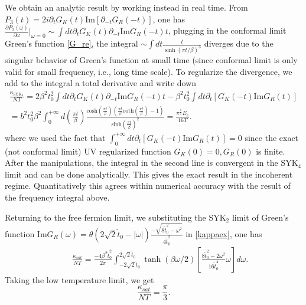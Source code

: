 \documentclass[twocolumn,floatfix,superscriptaddress]{revtex4-1}
\begin{document}
\begin{widetext}
We obtain an analytic result by working instead in real time. From $P_3(t)=2i\partial_tG_K(t)\text{Im}[\partial_{-t}G_R(-t)]$, one has $\frac{\partial P_3(\omega)}{\partial \omega}|_{\omega=0}\sim \int dt \partial_t G_K(t)\partial _{-t} \text{Im}G_R(-t) t$, plugging in the conformal limit Green's function \eqref{G_re}, the integral $\sim \int dt \frac{t}{\sinh(\pi t/\beta)^3}$ diverges due to the singular behavior of Green's function at small time (since conformal limit is only valid for small frequency, i.e., long time scale). To regularize the divergence, we add to the integral a total derivative and write down
\begin{eqnarray}
\frac{\kappa_{\text{SYK}_4}}{NT}=2\beta^2t_0^2\int dt  \partial_t G_K(t)\partial _{-t} \text{Im}G_R(-t) t-\beta^2 t_0^2 \int dt \partial_t[G_K(-t)\text{Im}G_R(t)]\nonumber\\
=b^2t_0^2\beta^2\int_0^{+\infty} d(\frac{\pi t}{\beta}) \frac{\text{cosh}(\frac{\pi t}{\beta})(\frac{\pi t}{\beta}\text{coth} (\frac{\pi t}{\beta})-1)}{\text{sinh}(\frac{\pi t}{\beta})^2}=\frac{\pi^{\frac{5}{2}}E_c}{16 T}.
\end{eqnarray}
where we used the fact that $\int_0^{+\infty}
dt \partial_t[G_K(-t)\text{Im}G_R(t)]=0$ since the exact (not
conformal limit) UV regularized function $G_K(0)=0, G_R(0)$ is
finite.  After the manipulations, the integral in the second line is
convergent in the SYK$_4$ limit and can be done analytically.  This
gives the exact result in the incoherent regime.  Quantitatively this
agrees within numerical accuracy with the result of the frequency
integral above.

Returning to the free fermion limit, we substituting the SYK$_2$ limit of Green's function $\text{Im}G_R(\omega)=\theta(2\sqrt 2 \tilde t_0-|\omega|)\frac{-\sqrt{8\tilde t_0^2-\omega^2}}{4\tilde t_0^2}$ in \eqref{kappaex}, one has
 \begin{eqnarray}
 &&\frac{\kappa_{sat}}{NT}=\frac{-4\beta^2\tilde
    t_0^2}{2\pi}\int_{-2\sqrt 2 \tilde t_0}^{2\sqrt 2 \tilde t_0}
    \tanh(\beta\omega/2)[\frac{8\tilde t_0^2-2\omega^2}{16\tilde
    t_0^4}\omega] d\omega. 
\end{eqnarray}
Taking the low temperature limit, we get
\begin{equation}
  \label{eq:2}
  \frac{\kappa_{sat}}{NT}=\frac{\pi}{3}.
\end{equation}



\end{widetext}
\end{document}
